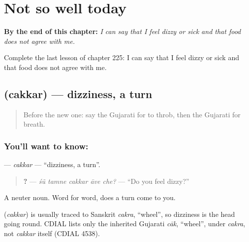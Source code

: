 
\chapter{Not so well today}
\label{ch:gu-not-so-well-today}

\begin{chapteropening}
\textbf{By the end of this chapter:} \emph{I can say that I feel dizzy or sick and that food does not agree with me.}

Complete the last lesson of chapter 225: I can say that I feel dizzy or sick and that food does not agree with me.
\end{chapteropening}

\section[\texorpdfstring{\gu{ચક્કર} (cakkar)}{ચક્કર (cakkar)}]{ (cakkar) — dizziness, a turn}

\label{lesson:GU-C225-cakkar}



\begin{quote}
Before the new one: say the Gujarati for to throb, then the Gujarati for breath.
\end{quote}

\subsection*{You'll want to know: }
\textbf{} — \emph{cakkar} — \textquotedblleft{}dizziness, a turn\textquotedblright{}.

\begin{quote}
\textbf{    ?} — \emph{śũ tamne cakkar āve che?} — \textquotedblleft{}Do you feel dizzy?\textquotedblright{}
\end{quote}

A neuter noun. Word for word, does a turn come to you.

\begin{cousinweb}
\textbf{} (\emph{cakkar}) is usually traced to Sanskrit \emph{cakra}, \textquotedblleft{}wheel\textquotedblright{}, so dizziness is the head going round. CDIAL lists only the inherited Gujarati \emph{cāk}, \textquotedblleft{}wheel\textquotedblright{}, under \emph{cakra}, not \emph{cakkar} itself (CDIAL 4538).
\end{cousinweb}

